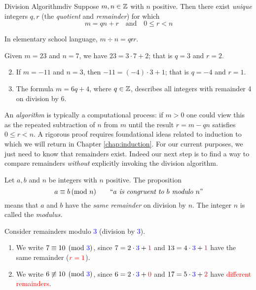 \begin{thm}{Division Algorithm}{div}
	Suppose $m,n\in\mathbb{Z}$ with $n$ positive. Then there exist \emph{unique} integers $q,r$ (the \emph{quotient} and \emph{remainder}) for which
	\[
		m=qn+r\quad\text{and}\quad 0\le r<n
	\]
\end{thm}


In elementary school language, $m\div n=q\mathbin{\mathsf r}r$.

\begin{examples}{}{}
	\exstart Given $m=23$ and $n=7$, we have $23=3\cdot 7+2$; that is $q=3$ and $r=2$.
	\begin{enumerate}\setcounter{enumi}{1}
		\item If $m=-11$ and $n=3$, then $-11=(-4)\cdot 3+1$; that is $q=-4$ and $r=1$.
		\item The formula $m=6q+4$, where $q\in\mathbb{Z}$, describes all integers with remainder 4 on division by 6.
	\end{enumerate}
\end{examples}

An \emph{algorithm} is typically a computational process: if $m>0$ one could view this as the repeated subtraction of $n$ from $m$ until the result $r=m-qn$ satisfies $0\le r<n$. A rigorous proof requires foundational ideas related to induction to which we will return in Chapter \ref{chap:induction}. For our current purposes, we just need to know that remainders exist. Indeed our next step is to find a way to compare remainders \emph{without} explicitly invoking the division algorithm.


\begin{defn}{}{}
	Let $a,b$ and $n$ be integers with $n$ positive. The proposition
	\[a\equiv b\negthickspace\pmod{n}\qquad \text{``\emph{$a$ is congruent to $b$ modulo $n$}''}\]
	means that $a$ and $b$ have the \emph{same remainder} on division by $n$. The integer $n$ is called the \emph{modulus.}
\end{defn}

\begin{examples}{}{}
	Consider remainders modulo \textcolor{blue}{3} (division by \textcolor{blue}{3}).
	\begin{enumerate}\itemsep1pt
	  \item We write $7\equiv 10\pmod{\textcolor{blue}{3}}$, since $7=2\cdot \textcolor{blue}{3}+\textcolor{red}{1}$ and $13=4\cdot \textcolor{blue}{3}+\textcolor{red}{1}$ have the same remainder ($\textcolor{red}{r=1}$).
	  \item We write $6\not\equiv 10\pmod{\textcolor{blue}{3}}$, since $6=2\cdot\textcolor{blue}{3}+\textcolor{red}{0}$ and $17=5\cdot\textcolor{blue}{3}+\textcolor{red}{2}$ have \textcolor{red}{different remainders}.
	\end{enumerate}
\end{examples}

